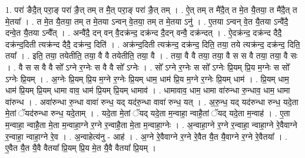 \documentclass[17pt]{extarticle}
\begin{document}
1. परा॑ ङैदै॒त् परा॒ङ् परा॑ ङै॒त् तम् त मै॒त् परा॒ङ् परा॑ ङै॒त् तम् । . ऐ॒त् तम् त मै॑दै॒त् त मे॒त यै॒तया॒ त मै॑दै॒त् त मे॒तया᳚ । . त मे॒त यै॒तया॒ तम् त मे॒तया ऽन्वन् वे॒तया॒ तम् त मे॒तया ऽनु॑ । . ए॒तया ऽन्वन् वे॒त यै॒तया ऽन्वै॑दै॒ दन्वे॒त यै॒तया ऽन्वै᳚त् । . अन्वै॑दै॒ दन् वन् वै॒दक्र॑न्द॒ दक्र॑न्द दै॒दन् वन्वै॒ दक्र॑न्दत् । . ऐ॒दक्र॑न्द॒ दक्र॑न्द दैदै॒ दक्र॑न्द॒दिती त्यक्र॑न्द दैदै॒ दक्र॑न्द॒ दिति॑ । . अक्र॑न्द॒दिती त्यक्र॑न्द॒ दक्र॑न्द॒ दिति॒ तया॒ तये त्यक्र॑न्द॒ दक्र॑न्द॒ दिति॒ तया᳚ । . इति॒ तया॒ तयेतीति॒ तया॒ वै वै तयेतीति॒ तया॒ वै । . तया॒ वै वै तया॒ तया॒ वै स स वै तया॒ तया॒ वै सः । . वै स स वै वै सो᳚ ऽग्ने र॒ग्नेः स वै वै सो᳚ ऽग्नेः । . सो᳚ ऽग्ने र॒ग्नेः स सो᳚ ऽग्नेः प्रि॒यम् प्रि॒य म॒ग्नेः स सो᳚ ऽग्नेः प्रि॒यम् । . अ॒ग्नेः प्रि॒यम् प्रि॒य म॒ग्ने र॒ग्नेः प्रि॒यम् धाम॒ धाम॑ प्रि॒य म॒ग्ने र॒ग्नेः प्रि॒यम् धाम॑ । . प्रि॒यम् धाम॒ धाम॑ प्रि॒यम् प्रि॒यम् धामा वाव॒ धाम॑ प्रि॒यम् प्रि॒यम् धामाव॑ । . धामावाव॒ धाम॒ धामा वा॑रुन्धा रु॒न्धाव॒ धाम॒ धामा वा॑रुन्ध । . अवा॑रुन्धा रु॒न्धा वावा॑ रुन्ध॒ यद् यद॑रु॒न्धा वावा॑ रुन्ध॒ यत् । . अ॒रु॒न्ध॒ यद् यद॑रुन्धा रुन्ध॒ यदे॒ता मे॒तां ॅयद॑रुन्धा रुन्ध॒ यदे॒ताम् । . यदे॒ता मे॒तां ॅयद् यदे॒ता म॒न्वाहा॒ न्वाहै॒तां ॅयद् यदे॒ता म॒न्वाह॑ । . ए॒ता म॒न्वाहा॒ न्वाहै॒ता मे॒ता म॒न्वाहा॒ग्ने र॒ग्ने र॒न्वाहै॒ता मे॒ता म॒न्वाहा॒ग्नेः । . अ॒न्वाहा॒ग्ने र॒ग्ने र॒न्वाहा॒ न्वाहा॒ग्ने रे॒वैवाग्ने र॒न्वाहा॒ न्वाहा॒ग्ने रे॒व । . अ॒न्वाहेत्य॑नु - आह॑ । . अ॒ग्ने रे॒वैवाग्ने र॒ग्ने रे॒वैत यै॒त यै॒वाग्ने र॒ग्ने रे॒वैतया᳚ । . ए॒वैत यै॒त यै॒वै वैतया᳚ प्रि॒यम् प्रि॒य मे॒त यै॒वै वैतया᳚ प्रि॒यम् । \newline
\end{document}
